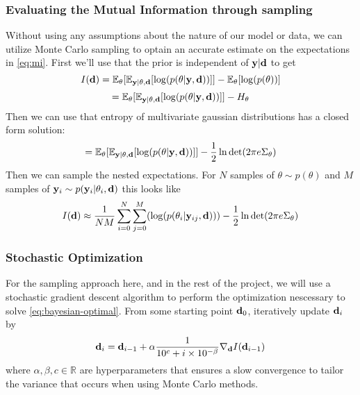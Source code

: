 \subsubsection{Evaluating the Mutual Information through sampling}
Without using any assumptions about the nature of our model or data, we can utilize Monte Carlo sampling to optain an accurate estimate on the expectations in \eqref{eq:mi}.
First we'll use that the prior is independent of $\mathbf{y}|\mathbf{d}$ to get
\begin{equation}
  I(\mathbf{d}) = \mathbb{E}_{\mathbf{\theta}}[\mathbb{E}_{\mathbf{y}| \theta, \mathbf{d}} [\log(p(\theta | \mathbf{y}, \mathbf{d}))]] - \mathbb{E}_{\theta}[\log(p(\theta))]
\end{equation}
\begin{equation}
  = \mathbb{E}_{\mathbf{\theta}}[\mathbb{E}_{\mathbf{y}| \theta, \mathbf{d}} [\log(p(\theta | \mathbf{y}, \mathbf{d}))]] - H_\theta
\end{equation}
Then we can use that entropy of multivariate gaussian distributions has a closed form solution:
\begin{equation}
  = \mathbb{E}_{\mathbf{\theta}}[\mathbb{E}_{\mathbf{y}| \theta, \mathbf{d}} [\log(p(\theta | \mathbf{y}, \mathbf{d}))]] - \frac{1}{2}\ln \det (2\pi e\Sigma_\theta)
\end{equation}
Then we can sample the nested expectations. For $N$ samples of $\theta \sim p(\theta)$ and $M$ samples of $\mathbf{y}_i \sim p(\mathbf{y}_i | \theta_i, \mathbf{d})$ this looks like
\begin{equation}
  \label{eq:mi-sampled}I(\mathbf{d}) \approx \frac{1}{NM}\sum_{i=0}^N\sum_{j=0}^M(\log (p(\theta_i | \mathbf{y}_{ij}, \mathbf{d}))) - \frac{1}{2}\ln \det (2\pi e\Sigma_\theta)
\end{equation}

\subsubsection{Stochastic Optimization}
For the sampling approach here, and in the rest of the project, we will use a stochastic gradient descent algorithm to perform the optimization nescessary to solve \ref{eq:bayesian-optimal}.
From some starting point $\mathbf{d}_0$, iteratively update $\mathbf{d}_i$ by
\begin{equation}
  \mathbf{d}_i = \mathbf{d}_{i-1} + \alpha \frac{1}{10^c + i \times 10^{-\beta}} \nabla_{\mathbf{d}} I(\mathbf{d}_{i-1})
\end{equation}
where $\alpha, \beta, c \in \mathbb{R}$ are hyperparameters that ensures a slow convergence to tailor the variance that occurs when using Monte Carlo methods.

